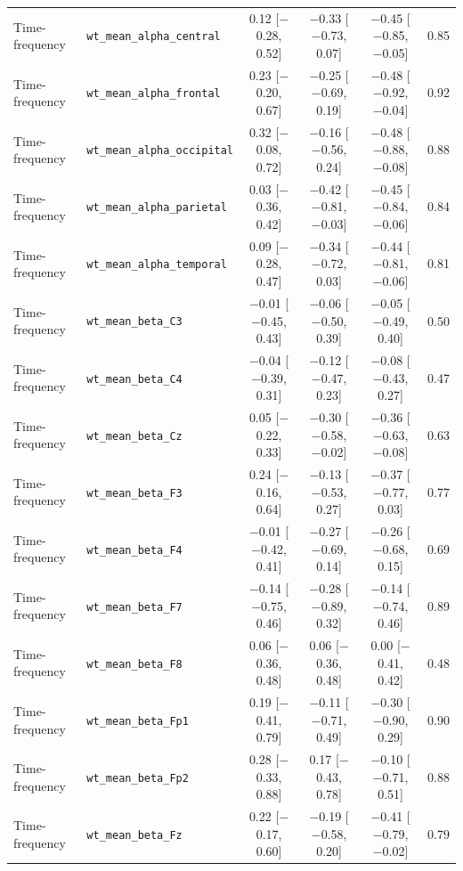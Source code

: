 {\begin{longtable}{llcccc}
Time-frequency & \texttt{wt\_mean\_alpha\_central} & 0.12 [$-$0.28, 0.52] & $-$0.33 [$-$0.73, 0.07] & $-$0.45 [$-$0.85, $-$0.05] & 0.85 \\
Time-frequency & \texttt{wt\_mean\_alpha\_frontal} & 0.23 [$-$0.20, 0.67] & $-$0.25 [$-$0.69, 0.19] & $-$0.48 [$-$0.92, $-$0.04] & 0.92 \\
Time-frequency & \texttt{wt\_mean\_alpha\_occipital} & 0.32 [$-$0.08, 0.72] & $-$0.16 [$-$0.56, 0.24] & $-$0.48 [$-$0.88, $-$0.08] & 0.88 \\
Time-frequency & \texttt{wt\_mean\_alpha\_parietal} & 0.03 [$-$0.36, 0.42] & $-$0.42 [$-$0.81, $-$0.03] & $-$0.45 [$-$0.84, $-$0.06] & 0.84 \\
Time-frequency & \texttt{wt\_mean\_alpha\_temporal} & 0.09 [$-$0.28, 0.47] & $-$0.34 [$-$0.72, 0.03] & $-$0.44 [$-$0.81, $-$0.06] & 0.81 \\
Time-frequency & \texttt{wt\_mean\_beta\_C3} & $-$0.01 [$-$0.45, 0.43] & $-$0.06 [$-$0.50, 0.39] & $-$0.05 [$-$0.49, 0.40] & 0.50 \\
Time-frequency & \texttt{wt\_mean\_beta\_C4} & $-$0.04 [$-$0.39, 0.31] & $-$0.12 [$-$0.47, 0.23] & $-$0.08 [$-$0.43, 0.27] & 0.47 \\
Time-frequency & \texttt{wt\_mean\_beta\_Cz} & 0.05 [$-$0.22, 0.33] & $-$0.30 [$-$0.58, $-$0.02] & $-$0.36 [$-$0.63, $-$0.08] & 0.63 \\
Time-frequency & \texttt{wt\_mean\_beta\_F3} & 0.24 [$-$0.16, 0.64] & $-$0.13 [$-$0.53, 0.27] & $-$0.37 [$-$0.77, 0.03] & 0.77 \\
Time-frequency & \texttt{wt\_mean\_beta\_F4} & $-$0.01 [$-$0.42, 0.41] & $-$0.27 [$-$0.69, 0.14] & $-$0.26 [$-$0.68, 0.15] & 0.69 \\
Time-frequency & \texttt{wt\_mean\_beta\_F7} & $-$0.14 [$-$0.75, 0.46] & $-$0.28 [$-$0.89, 0.32] & $-$0.14 [$-$0.74, 0.46] & 0.89 \\
Time-frequency & \texttt{wt\_mean\_beta\_F8} & 0.06 [$-$0.36, 0.48] & 0.06 [$-$0.36, 0.48] & 0.00 [$-$0.41, 0.42] & 0.48 \\
Time-frequency & \texttt{wt\_mean\_beta\_Fp1} & 0.19 [$-$0.41, 0.79] & $-$0.11 [$-$0.71, 0.49] & $-$0.30 [$-$0.90, 0.29] & 0.90 \\
Time-frequency & \texttt{wt\_mean\_beta\_Fp2} & 0.28 [$-$0.33, 0.88] & 0.17 [$-$0.43, 0.78] & $-$0.10 [$-$0.71, 0.51] & 0.88 \\
Time-frequency & \texttt{wt\_mean\_beta\_Fz} & 0.22 [$-$0.17, 0.60] & $-$0.19 [$-$0.58, 0.20] & $-$0.41 [$-$0.79, $-$0.02] & 0.79 \\

\end{longtable}}
